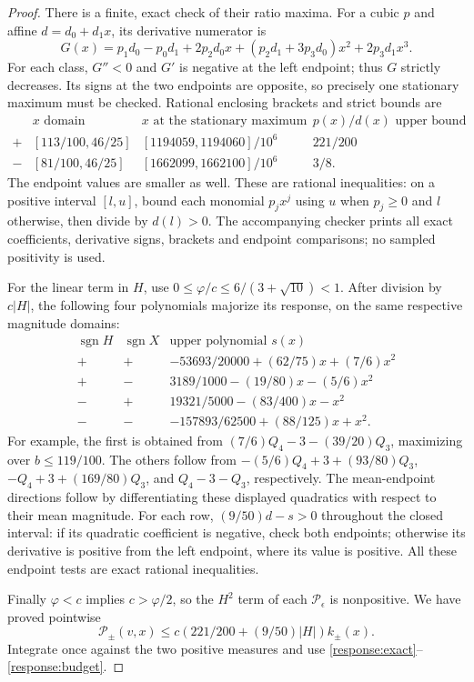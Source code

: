 \begin{proof}
There is a finite, exact check of their ratio maxima. For a cubic $p$
and affine $d=d_0+d_1x$, its derivative numerator is
\[
 G(x)=p_1d_0-p_0d_1+2p_2d_0x+(p_2d_1+3p_3d_0)x^2+2p_3d_1x^3.
\]
For each class, $G''<0$ and $G'$ is negative at the left endpoint;
thus $G$ strictly decreases. Its signs at the two endpoints are opposite,
so precisely one stationary maximum must be checked. Rational enclosing
brackets and strict bounds are
\[
\begin{array}{c|c|c|c}
 &x\text{ domain}&x\text{ at the stationary maximum}&p(x)/d(x)\text{ upper bound}\\\hline
 +&[113/100,46/25]&[1194059,1194060]/10^6&221/200\\
 -&[81/100,46/25]&[1662099,1662100]/10^6&3/8.
\end{array}
\]
The endpoint values are smaller as well. These are rational inequalities:
on a positive interval $[l,u]$, bound each monomial $p_jx^j$ using $u$
when $p_j\ge0$ and $l$ otherwise, then divide by $d(l)>0$.
The accompanying checker prints all exact coefficients, derivative signs,
brackets and endpoint comparisons; no sampled positivity is used.

For the linear term in $H$, use
$0\le\varphi/c\le6/(3+\sqrt{10})<1$.
After division by $c|H|$, the following four polynomials majorize its
response, on the same respective magnitude domains:
\[
\begin{array}{c|c|c}
\operatorname{sgn}H&\operatorname{sgn}X&\text{upper polynomial }s(x)\\\hline
 +&+&-53693/20000+(62/75)x+(7/6)x^2\\
 +&-&3189/1000-(19/80)x-(5/6)x^2\\
 -&+&19321/5000-(83/400)x-x^2\\
 -&-&-157893/62500+(88/125)x+x^2.
\end{array}
\]
For example, the first is obtained from
$(7/6)Q_4-3-(39/20)Q_3$, maximizing over $b\le119/100$.
The others follow from
$-(5/6)Q_4+3+(93/80)Q_3$,
$-Q_4+3+(169/80)Q_3$, and $Q_4-3-Q_3$,
respectively. The mean-endpoint directions follow by differentiating
these displayed quadratics with respect to their mean magnitude.
For each row, $(9/50)d-s>0$ throughout the closed interval: if its
quadratic coefficient is negative, check both endpoints; otherwise
its derivative is positive from the left endpoint, where its value
is positive. All these endpoint tests are exact rational inequalities.

Finally $\varphi<c$ implies $c>\varphi/2$, so the $H^2$ term of each
$\mathscr P_\epsilon$ is nonpositive. We have proved pointwise
\[
 \mathscr P_\pm(v,x)\le c\left(221/200+(9/50)|H|\right)k_\pm(x).
\]
Integrate once against the two positive measures and use
\eqref{response:exact}--\eqref{response:budget}.
\end{proof}

